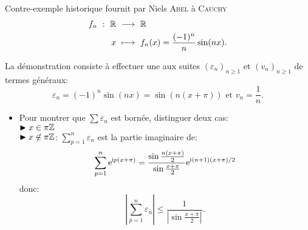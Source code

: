 \begin{box_titre}{Contre-exemple historique fournit par Niels \textsc{Abel} à \textsc{Cauchy}}
    \begin{alignat*}{2}
        f_n\ :\ \mathbb{R}\ &\longrightarrow\ \mathbb{R}\\
        x\ &\longmapsto\ f_n(x) = \frac{(-1)^n}{n}\sin(nx).
    \end{alignat*}
\end{box_titre}

La démonstration consiste à effectuer une  aux suites $(\varepsilon_n)_{n\geqslant1}$ et $(v_n)_{n\geqslant1}$ de termes généraux:
$$\varepsilon_n = (-1)^n \sin(nx) = \sin(n(x + \pi)) \text{ et } v_n = \frac{1}{n}.$$
\begin{itemize}
    \item Pour montrer que $\sum \varepsilon_n$ est bornée, distinguer deux cas:\\
    $\blacktriangleright x \in \pi \mathbb{Z}$\\
    $\blacktriangleright x \not \in \pi \mathbb{Z}$:
    $\sum\limits_{p=1}^{n} \varepsilon_n$ est la partie imaginaire de:\\
    $$\sum_{p=1}^{n} \mathrm{e}^{\mathrm{i} p(x+\pi)} = \frac{\sin\frac{n(x+\pi)}{2}}{\sin\frac{x+\pi}{2}}\mathrm{e}^{\mathrm{i} (n+1)(x+\pi)/2}$$
    donc:
    $$\left| \sum_{p=1}^{n} \varepsilon_n \right| \leqslant \frac{1}{\left|\sin\frac{x+\pi}{2} \right|}.$$
\end{itemize}